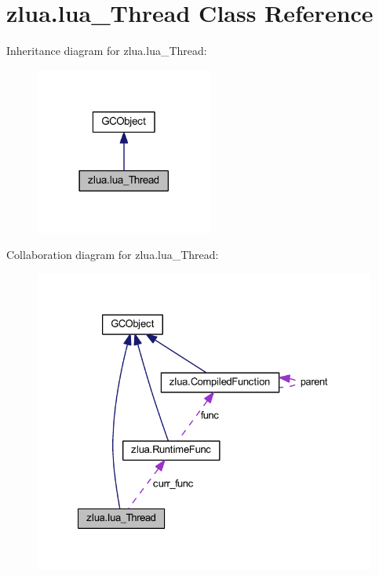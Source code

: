 \hypertarget{classzlua_1_1lua___thread}{}\section{zlua.\+lua\+\_\+\+Thread Class Reference}
\label{classzlua_1_1lua___thread}


Inheritance diagram for zlua.\+lua\+\_\+\+Thread\+:
\nopagebreak
\begin{figure}[H]
\begin{center}
\leavevmode
\includegraphics[width=165pt]{classzlua_1_1lua___thread__inherit__graph}
\end{center}
\end{figure}


Collaboration diagram for zlua.\+lua\+\_\+\+Thread\+:
\nopagebreak
\begin{figure}[H]
\begin{center}
\leavevmode
\includegraphics[width=327pt]{classzlua_1_1lua___thread__coll__graph}
\end{center}
\end{figure}

